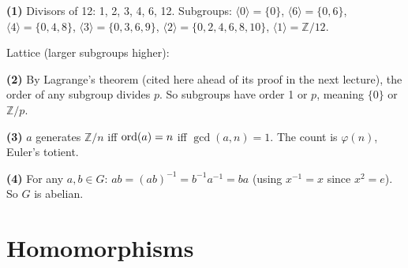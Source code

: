 \documentclass{report}
\begin{document}
\begin{solution}
\textbf{(1)} Divisors of 12: 1, 2, 3, 4, 6, 12. Subgroups: \(\langle 0 \rangle = \{0\}\), \(\langle 6 \rangle = \{0, 6\}\), \(\langle 4 \rangle = \{0, 4, 8\}\), \(\langle 3 \rangle = \{0, 3, 6, 9\}\), \(\langle 2 \rangle = \{0, 2, 4, 6, 8, 10\}\), \(\langle 1 \rangle = \mathbb{Z}/12\).

Lattice (larger subgroups higher):
\begin{center}
\end{center}

\textbf{(2)} By Lagrange's theorem (cited here ahead of its proof in the next lecture), the order of any subgroup divides \(p\). So subgroups have order 1 or \(p\), meaning \(\{0\}\) or \(\mathbb{Z}/p\).

\textbf{(3)} \(a\) generates \(\mathbb{Z}/n\) iff \(\operatorname{ord}(a) = n\) iff \(\gcd(a, n) = 1\). The count is \(\varphi(n)\), Euler's totient.

\textbf{(4)} For any \(a, b \in G\): \(ab = (ab)^{-1} = b^{-1}a^{-1} = ba\) (using \(x^{-1} = x\) since \(x^2 = e\)). So \(G\) is abelian.
\end{solution}

\section{Homomorphisms}


\end{document}
